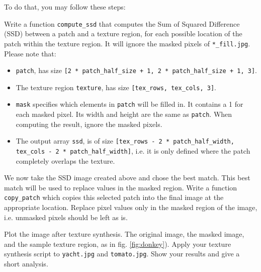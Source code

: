 \documentclass[12pt]{article}
\begin{document}
To do that, you may follow these steps:
\begin{question}
Write a function \texttt{compute\_ssd} that computes the Sum of Squared Difference (SSD) between a patch and a texture region, for each possible location of the patch within the texture region. It will ignore the masked pixels of \texttt{*\_fill.jpg}. Please note that:
\begin{itemize}
\item \texttt{patch}, has size \texttt{[2 * patch\_half\_size + 1, 2 * patch\_half\_size + 1, 3]}.
\item The texture region \texttt{texture}, has size \texttt{[tex\_rows, tex\_cols, 3]}.
\item \texttt{mask} specifies which elements in \texttt{patch} will be filled in. It contains a 1 for each masked pixel. Its width and height are the same as \texttt{patch}. When computing the result, ignore the masked pixels. 
\item The output array \texttt{ssd}, is of size \texttt{[tex\_rows - 2 * patch\_half\_width, tex\_cols - 2 * patch\_half\_width]}, i.e. it is only defined where the patch completely overlaps the texture. 
\end{itemize}
\end{question}

\begin{question}
  We now take the SSD image created above and chose the best match.
  This best match will be used to replace values in the masked region.
  Write a function \texttt{copy\_patch} which copies this selected patch into the final image at the appropriate location.
Replace pixel values only in the masked region of the image, i.e. unmasked pixels should be left as is.
\end{question}

\begin{question}
Plot the image after texture synthesis. The original image, the masked image, and the sample texture region, as in fig. \ref{fig:donkey}). Apply your texture synthesis script to \texttt{yacht.jpg} and \texttt{tomato.jpg}. Show your results and give a short analysis.
\end{question}


\end{document}
